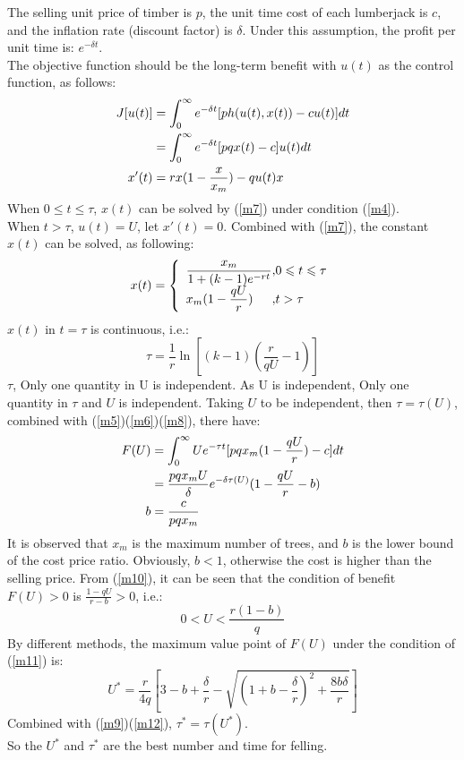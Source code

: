 \documentclass[12pt]{article}
\begin{document}
The selling unit price of timber is $p$, the unit time cost of each lumberjack
is $c$, and the inflation rate (discount factor) is $\delta$. Under this
assumption, the profit per unit time is: $e^{-\delta t}$.\\ The objective
function should be the long-term benefit with $u(t)$ as the control function,
as follows:
\begin{align}
    J[u(t)] & =\int_0^\infty e^{-\delta t}[ph(u(t),x(t))-cu(t)]dt \notag \\
            & =\int_0^\infty e^{-\delta t}[pqx(t)-c]u(t)dt \label{m6}    \\
    x'(t)   & =rx(1-\frac{x}{x_m})-qu(t)x \label{m7}
\end{align}
When $0 \leqslant t \leqslant \tau$,
$x(t)$ can be solved by (\ref{m7}) under condition (\ref{m4}).\\
When $t > \tau$, $u(t)=U$, let $x'(t) = 0$. Combined with (\ref{m7}),
the constant $x(t)$ can be solved, as following:
\begin{align}
    x(t)=\left\{
    \begin{array}{l@{,}l}
        \dfrac{x_m}{1+(k-1)e^{-rt}} & 0\leqslant t \leqslant \tau \\
        x_m(1-\dfrac{qU}{r})        & t>\tau
    \end{array}
    \right.
    \label{m8}
\end{align}
$x(t)$ in $t=\tau$ is continuous, i.e.:
\begin{equation}
    \tau = \frac{1}{r}\ln [(k-1)(\frac{r}{qU}-1)] \label{m9}
\end{equation}
$\tau$, Only one quantity in U is independent. As U is independent,
Only one quantity in $\tau$ and $U$ is independent. Taking $U$ to be independent,
then $\tau=\tau(U)$, combined with (\ref{m5})(\ref{m6})(\ref{m8}), there have:
\begin{align}
    F(U) & = \int^\infty_0 Ue^{-\tau t}[pqx_m(1-\frac{qU}{r})-c]dt \notag          \\
         & = \frac{pqx_mU}{\delta}e^{-\delta\tau(U)}(1-\frac{qU}{r}-b) \label{m10} \\
    b    & = \frac{c}{pqx_m} \notag
\end{align}
It is observed that $x_m$ is the maximum number of trees,
and $b$ is the lower bound of the cost price ratio.
Obviously, $b < 1$, otherwise the cost is higher than the selling price.
From (\ref{m10}), it can be seen that the condition of benefit $F(U) > 0$ is $\frac{1-qU}{r-b}>0$,
i.e.:
\begin{equation}
    0<U<\frac{r(1-b)}{q} \label{m11}
\end{equation}
By different methods, the maximum value point of $F(U)$ under the condition of (\ref{m11}) is:
\begin{equation}
    U^*=\frac{r}{4q}\left[3-b+\frac{\delta}{r}-\sqrt{(1+b-\frac{\delta}{r})^2+\frac{8b\delta}{r}}\right]
    \label{m12}
\end{equation}
Combined with (\ref{m9})(\ref{m12}), $\tau^*=\tau(U^*)$.\\
So the $U^*$ and $\tau^*$ are the best number and time for felling.
\end{document}

